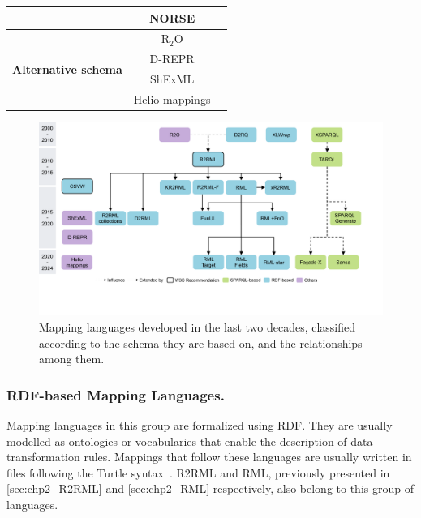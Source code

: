 \begin{table}[t]
{\begin{tabular}{ccc}
                              & NORSE            & \parencite{stadler2023spark}\\ \midrule
\multirow{4}{*}{\textbf{Alternative schema}}       & R$_2$O          & \parencite{barrasa2004r2o}\\ %
                              & D-REPR          & \parencite{Vu2019d-repr}\\ %
                              & ShExML          & \parencite{Garcia-Gonzalez2020shexml,shexml}\\ %
                              & Helio mappings  & \parencite{cimmino2022helio}\\ 
                              \bottomrule
\end{tabular}}
\end{table}



\begin{figure}[t]
\centering
\includegraphics[width=1\linewidth]{figures/chp2_mapping_languages}
\caption[Existing mapping languages and the relationships among them]{Mapping languages developed in the last two decades, classified according to the schema they are based on, and the relationships among them.}
\label{fig:chp2_mapping_languages}
\end{figure}




\subsubsection{RDF-based Mapping Languages.} 
\label{sec:chp2_RDF-languages}

Mapping languages in this group are formalized using RDF. They are usually modelled as ontologies or vocabularies that enable the description of data transformation rules. Mappings that follow these languages are usually written in files following the Turtle syntax~\parencite{turtle}. R2RML and RML, previously presented in \cref{sec:chp2_R2RML}
and \cref{sec:chp2_RML} respectively, also belong to this group of languages. 


